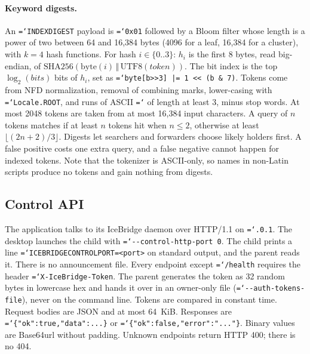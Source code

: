 \documentclass[11pt,a4paper]{article}
\newcommand{\code}[1]{\texttt{\hyphenchar\font=`\-\relax #1}}
\DeclareRobustCommand{\_}{\origunderscore\allowbreak}
\begin{document}
\paragraph{Keyword digests.} An \code{INDEX\_DIGEST} payload is \code{0x01} followed by a
Bloom filter whose length is a power of two between 64 and 16{,}384 bytes (4096 for a leaf,
16{,}384 for a cluster), with $k = 4$ hash functions. For hash $i \in \{0..3\}$:
$h_i$ is the first 8 bytes, read big-endian, of $\mathrm{SHA256}(\mathrm{byte}(i) \,\Vert\,
\mathrm{UTF8}(\mathit{token}))$. The bit index is the top $\log_2(\mathit{bits})$ bits of
$h_i$, set as \code{byte[b>>3] |= 1 << (b \& 7)}. Tokens come from NFD normalization,
removal of combining marks, lower-casing with \code{Locale.ROOT}, and runs of ASCII
\code{[a-z0-9]} of length at least 3, minus stop words. At most 2048 tokens are taken from at
most 16{,}384 input characters. A query of $n$ tokens matches if at least $n$ tokens hit
when $n \le 2$, otherwise at least $\lfloor (2n+2)/3 \rfloor$. Digests let searchers and
forwarders choose likely holders first. A false positive costs one extra query, and a false
negative cannot happen for indexed tokens. Note that the tokenizer is ASCII-only, so names in
non-Latin scripts produce no tokens and gain nothing from digests.

\subsection{Control API}
\label{sec:control}
The application talks to its IceBridge daemon over HTTP/1.1 on \code{127.0.0.1}. The desktop
launches the child with \code{-{}-control-http-port 0}. The child prints a line
\code{ICEBRIDGE\_CONTROL\_PORT=<port>} on standard output, and the parent reads it. There is
no announcement file. Every endpoint except \code{/health} requires the header
\code{X-IceBridge-Token}. The parent generates the token as 32 random bytes in lowercase hex
and hands it over in an owner-only file (\code{-{}-auth-tokens-file}), never on the command
line. Tokens are compared in constant time. Request bodies are JSON and at most 64~KiB.
Responses are \code{\{"ok":true,"data":...\}} or \code{\{"ok":false,"error":"..."\}}. Binary
values are Base64url without padding. Unknown endpoints return HTTP 400; there is no 404.
\end{document}
